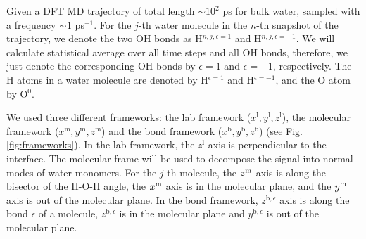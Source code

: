 Given a DFT MD trajectory of total length $\sim 10^2$ ps for bulk water, sampled with a frequency $\sim 1$ ps$^{-1}$.
For the $j$-th water molecule in the $n$-th snapshot of the trajectory, 
we denote the two OH bonds as H$^{n,j,\epsilon=1}$ and H$^{n,j,\epsilon=-1}$. We will calculate statistical average over all time steps and all OH bonds, therefore, 
we just denote the corresponding OH bonds by ${\epsilon=1}$ and ${\epsilon=-1}$, respectively. 
The H atoms in a water molecule are denoted by H$^{\epsilon=1}$ and H$^{\epsilon=-1}$, and the O atom by O$^{0}$.

We used three different frameworks: the lab framework ($x^{\text{l}},y^{\text{l}},z^{\text{l}}$), the molecular framework
($x^{\text{m}},y^{\text{m}},z^{\text{m}}$) and the bond framework ($x^{\text{b}},y^{\text{b}},z^{\text{b}}$) (see Fig.\thinspace\ref{fig:frameworks}).
In the lab framework, the $z^{\text{l}}$-axis is perpendicular to the interface.
The molecular frame will be used to decompose the signal into normal modes of water monomers.
For the $j$-th molecule, the $z^{\text m}$ axis is along the bisector of the H-O-H angle, the $x^{\text m}$ axis is in the molecular plane,
and the $y^{\text m}$ axis is out of the molecular plane. 
In the bond framework, $z^{\text{b},\epsilon}$ axis is along the bond $\epsilon$ of a molecule, $z^{\text{b},\epsilon}$
is in the molecular plane and $y^{\text{b},\epsilon}$ is out of the molecular plane.

